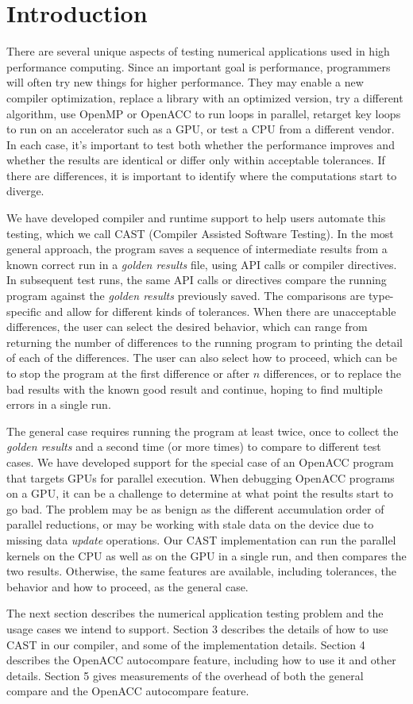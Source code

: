 \section{Introduction}

There are several unique aspects of testing numerical applications used in high performance computing.
Since an important goal is performance, programmers will often try new things for higher performance.
They may enable a new compiler optimization, replace a library with an optimized version, try a different algorithm, use OpenMP or OpenACC to run loops in parallel, retarget key loops to run on an accelerator such as a GPU, or test a CPU from a different vendor.
In each case, it's important to test both whether the performance improves and whether the results are identical or differ only within acceptable tolerances.
If there are differences, it is important to identify where the computations start to diverge.

We have developed compiler and runtime support to help users automate this testing, which we call CAST (Compiler Assisted Software Testing).
In the most general approach, the program saves a sequence of intermediate results from a known correct run in a \emph{golden results} file, using API calls or compiler directives.
In subsequent test runs, the same API calls or directives compare the running program against the \emph{golden results} previously saved.
The comparisons are type-specific and allow for different kinds of tolerances.
When there are unacceptable differences, the user can select the desired behavior, which can range from returning the number of differences to the running program to printing the detail of each of the differences.
The user can also select how to proceed, which can be to stop the program at the first difference or after $n$ differences, or to replace the bad results with the known good result and continue, hoping to find multiple errors in a single run.

The general case requires running the program at least twice, once to collect the \emph{golden results} and a second time (or more times) to compare to different test cases.
We have developed support for the special case of an OpenACC program that targets GPUs for parallel execution.
When debugging OpenACC programs on a GPU, it can be a challenge to determine at what point the results start to go bad.
The problem may be as benign as the different accumulation order of parallel reductions, or may be working with stale data on the device due to missing data \emph{update} operations.
Our CAST implementation can run the parallel kernels on the CPU as well as on the GPU in a single run, and then compares the two results.
Otherwise, the same features are available, including tolerances, the behavior and how to proceed, as the general case.

The next section describes the numerical application testing problem and the usage cases we intend to support.
Section 3 describes the details of how to use CAST in our compiler, and some of the implementation details.
Section 4 describes the OpenACC autocompare feature, including how to use it and other details.
Section 5 gives measurements of the overhead of both the general compare and the OpenACC autocompare feature.


